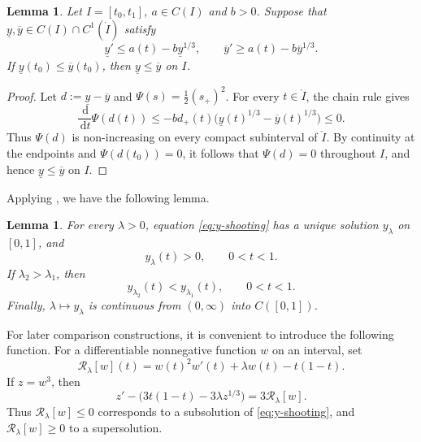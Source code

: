 \documentclass[12pt,preprint]{amsart}
\numberwithin{equation}{section}
\theoremstyle{plain}
\newtheorem{lemma}[theorem]{Lemma}
\theoremstyle{definition}
\newcommand{\dd}{\,\mathrm d}
\begin{document}
\begin{lemma}
\label{lem:cuberoot-comparison}
Let \(I=[t_0,t_1]\), \(a\in C(I)\) and \(b>0\). Suppose that
\(\underline y,\overline y\in C(I)\cap C^1(\mathring{I})\) satisfy
\[
 \underline y'\le a(t)-b\underline y^{1/3},
 \qquad
 \overline y'\ge a(t)-b\overline y^{1/3}.
\]
If
\(\underline y(t_0)\le\overline y(t_0)\), then
\(\underline y\le\overline y\) on \(I\).
\end{lemma}

\begin{proof}
Let \(d:=\underline y-\overline y\) and
\(\Psi(s)=\frac12(s_+)^2\).  For every \(t\in\mathring I\), the chain
rule gives
\[
 \frac{\dd}{\dd t}\Psi(d(t))
 \le -b d_+(t)
 \bigl(\underline y(t)^{1/3}-\overline y(t)^{1/3}\bigr)
 \le 0.
\]
Thus \(\Psi(d)\) is non-increasing on every compact subinterval of
$\mathring I$.  By continuity at the endpoints and
\(\Psi(d(t_0))=0\), it follows that \(\Psi(d)=0\) throughout \(I\), and hence
\(\underline y\le\overline y\) on \(I\).
\end{proof}

Applying \cite[Proposition 3.(a)(e)(f)]{EnguicaGavioliSanchez2013}, we have the following lemma.
\begin{lemma}
\label{lem:shooting-properties}
For every \(\lambda>0\), equation \eqref{eq:y-shooting} has a unique solution
\(y_\lambda\) on \([0,1]\), and
\begin{equation}
    \label{eq:y>0}
y_\lambda(t)>0,\qquad 0<t<1.
\end{equation}
  If
\(\lambda_2>\lambda_1\), then
\begin{equation}
 y_{\lambda_2}(t)<y_{\lambda_1}(t),
 \qquad 0<t<1.
 \label{eq:shooting-strict-order}
\end{equation}
Finally, \(\lambda\mapsto y_\lambda\) is continuous from \((0,\infty)\) into \(C([0,1])\).
\end{lemma}


For later comparison constructions, it is convenient to introduce the
following function.  For a differentiable nonnegative function $w$ on an interval, set
\[
 \mathcal R_\lambda[w](t)=w(t)^2w'(t)+\lambda w(t)-t(1-t).
\]
If \(z=w^3\), then
\[
 z'-\bigl(3t(1-t)-3\lambda z^{1/3}\bigr)=3\mathcal R_\lambda[w].
\]
Thus \(\mathcal R_\lambda[w]\le0\) corresponds to a subsolution of
\eqref{eq:y-shooting}, and \(\mathcal R_\lambda[w]\ge0\) to a supersolution.
\end{document}
